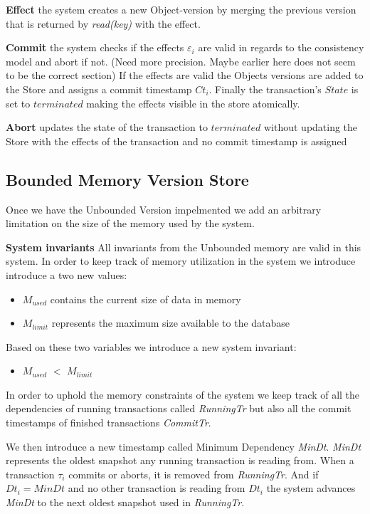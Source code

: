 \documentclass[systeme,french,english]{compas2022}
\begin{document}
\textbf{Effect} the system creates a new Object-version by merging the previous version that is returned by \emph{read(key)} with the effect.

\textbf{Commit} the system checks if the effects $\varepsilon_i$ are valid in regards to the consistency model and abort if not. (Need more precision. Maybe earlier here does not seem to be the correct section)
If the effects are valid the Objects versions are added to the Store and assigns a commit timestamp $Ct_i$.
Finally the transaction's $State$ is set to $terminated$ making the effects visible in the store atomically.

\textbf{Abort} updates the state of the transaction to $terminated$ without updating the Store with the effects of the transaction and no commit timestamp is assigned

\subsection{Bounded Memory Version Store }

Once we have the Unbounded Version impelmented we add an arbitrary limitation on the size of the memory used by the system.

\textbf{System invariants}
All invariants from the Unbounded memory are valid in this system.
In order to keep track of memory utilization in the system we introduce introduce a two new values:
\begin{itemize}
  \item \emph{$M_{used}$} contains the current size of data in memory
  \item \emph{$M_{limit}$} represents the maximum size available to the database
\end{itemize}
Based on these two variables we introduce a new system invariant:
\begin{itemize}
  \item \emph{$M_{used}$} $<$ \emph{$M_{limit}$}
\end{itemize}
In order to uphold the memory constraints of the system we keep track of all the dependencies of running transactions called \emph{RunningTr} but also all the commit timestamps of finished transactions \emph{CommitTr}.

We then introduce a new timestamp called Minimum Dependency \emph{MinDt}.
\emph{MinDt} represents the oldest snapshot any running transaction is reading from.
When a transaction $\tau_i$ commits or aborts, it is removed from \emph{RunningTr}. 
And if $Dt_i = MinDt$ and no other transaction is reading from $Dt_i$ the system advances \emph{MinDt} to the next oldest snapshot used in \emph{RunningTr}.
\end{document}
